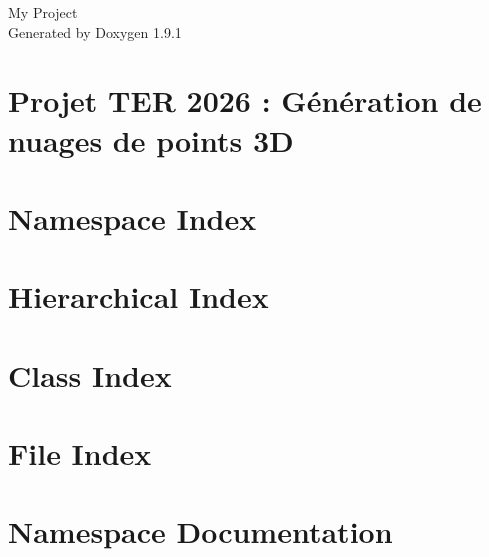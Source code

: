 \let\mypdfximage\pdfximage\def\pdfximage{\immediate\mypdfximage}\documentclass[twoside]{book}
\newcommand{\+}{\discretionary{\mbox{\scriptsize$\hookleftarrow$}}{}{}}
\newcommand{\clearemptydoublepage}{%
  \newpage{\pagestyle{empty}\cleardoublepage}%
}
\begin{document}
\raggedbottom

\hypersetup{pageanchor=false,
             bookmarksnumbered=true,
             pdfencoding=unicode
            }
\begin{titlepage}
\vspace*{7cm}
\begin{center}%
{\Large My Project }\\
\vspace*{1cm}
{\large Generated by Doxygen 1.9.1}\\
\end{center}
\end{titlepage}
\clearemptydoublepage
{}
\tableofcontents
\clearemptydoublepage
{}
\hypersetup{pageanchor=true}

\chapter{Projet TER 2026 \+: Génération de nuages de points 3D}
\label{md_readme}

\chapter{Namespace Index}

\chapter{Hierarchical Index}

\chapter{Class Index}

\chapter{File Index}

\chapter{Namespace Documentation}

\end{document}
